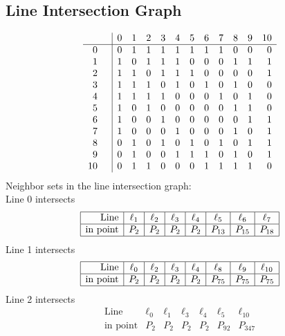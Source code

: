 \documentclass{article}
\begin{document}
{\subsection*{Line Intersection Graph}
{\arraycolsep=1pt
$$
\begin{array}{rr|*{11}r}
 &  & 0 & 1 & 2 & 3 & 4 & 5 & 6 & 7 & 8 & 9 & 10\\
\hline
0 &  & 0 & 1 & 1 & 1 & 1 & 1 & 1 & 1 & 0 & 0 & 0\\
1 &  & 1 & 0 & 1 & 1 & 1 & 0 & 0 & 0 & 1 & 1 & 1\\
2 &  & 1 & 1 & 0 & 1 & 1 & 1 & 0 & 0 & 0 & 0 & 1\\
3 &  & 1 & 1 & 1 & 0 & 1 & 0 & 1 & 0 & 1 & 0 & 0\\
4 &  & 1 & 1 & 1 & 1 & 0 & 0 & 0 & 1 & 0 & 1 & 0\\
5 &  & 1 & 0 & 1 & 0 & 0 & 0 & 0 & 0 & 1 & 1 & 0\\
6 &  & 1 & 0 & 0 & 1 & 0 & 0 & 0 & 0 & 0 & 1 & 1\\
7 &  & 1 & 0 & 0 & 0 & 1 & 0 & 0 & 0 & 1 & 0 & 1\\
8 &  & 0 & 1 & 0 & 1 & 0 & 1 & 0 & 1 & 0 & 1 & 1\\
9 &  & 0 & 1 & 0 & 0 & 1 & 1 & 1 & 0 & 1 & 0 & 1\\
10 &  & 0 & 1 & 1 & 0 & 0 & 0 & 1 & 1 & 1 & 1 & 0\\
\end{array}
$$
}%
Neighbor sets in the line intersection graph:\\
Line 0 intersects 
$$
\begin{array}{|r*{7}{|c}|}
\hline
\mbox{Line}  & \ell_{1} & \ell_{2} & \ell_{3} & \ell_{4} & \ell_{5} & \ell_{6} & \ell_{7}\\
\hline
\mbox{in point}  & P_{2} & P_{2} & P_{2} & P_{2} & P_{13} & P_{15} & P_{18}\\
\hline
\end{array}
$$
Line 1 intersects 
$$
\begin{array}{|r*{7}{|c}|}
\hline
\mbox{Line}  & \ell_{0} & \ell_{2} & \ell_{3} & \ell_{4} & \ell_{8} & \ell_{9} & \ell_{10}\\
\hline
\mbox{in point}  & P_{2} & P_{2} & P_{2} & P_{2} & P_{75} & P_{75} & P_{75}\\
\hline
\end{array}
$$
Line 2 intersects 
$$
\begin{array}{|r*{6}{|c}|}
\hline
\mbox{Line}  & \ell_{0} & \ell_{1} & \ell_{3} & \ell_{4} & \ell_{5} & \ell_{10}\\
\hline
\mbox{in point}  & P_{2} & P_{2} & P_{2} & P_{2} & P_{92} & P_{347}\\

\end{array}$$}
\end{document}
